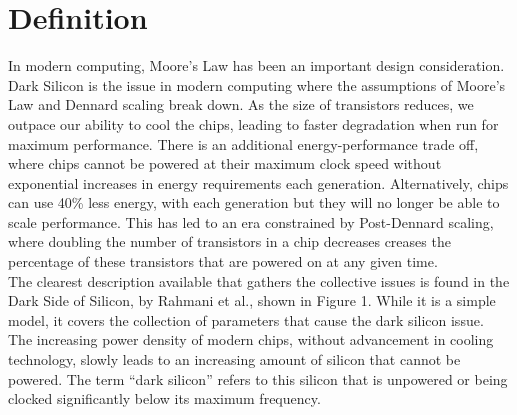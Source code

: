 

\section{Definition}
	In modern computing, Moore's Law has been an important design consideration.\\
	
	Dark Silicon is the issue in modern computing where the assumptions of Moore’s Law and Dennard scaling break down. As the size of transistors reduces, we outpace our ability to cool the chips, leading to faster degradation when run for maximum performance. There is an additional energy-performance trade off, where chips cannot be powered at their maximum clock speed without exponential increases in energy requirements each generation. Alternatively, chips can use 40\% less energy, with each generation but they will no longer be able to scale performance. This has led to an era constrained by Post-Dennard scaling, where doubling the number of transistors in a chip decreases creases the percentage of these transistors that are powered on at any given time.\\
	The clearest description available that gathers the collective issues is found in the Dark Side of Silicon, by Rahmani et al., shown in Figure 1. While it is a simple model, it covers the collection of parameters that cause the dark silicon issue. The increasing power density of modern chips, without advancement in cooling technology, slowly leads to an increasing amount of silicon that cannot be powered.
	The term “dark silicon” refers to this silicon that is unpowered or being clocked significantly below its maximum frequency. 

